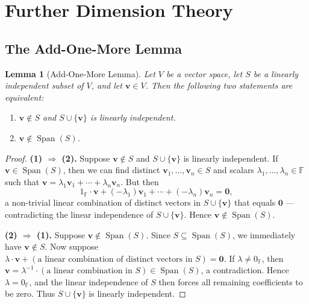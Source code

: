 \documentclass[11pt, a4paper, notitlepage]{report}
\newtheorem{lemma}[theorem]{Lemma}
\theoremstyle{definition}
\theoremstyle{remark}
\begin{document}
\section{Further Dimension Theory}
\label{sec:dimension-week4}

\subsection{The Add-One-More Lemma}

\begin{lemma}[Add-One-More Lemma]\label{lem:add-one-more}
Let $V$ be a vector space, let $S$ be a linearly independent subset of $V$, and let $\mathbf{v}\in V$. Then the following two statements are equivalent:
\begin{enumerate}
  \item $\mathbf{v}\notin S$ and $S\cup\{\mathbf{v}\}$ is linearly independent.
  \item $\mathbf{v}\notin\operatorname{Span}(S)$.
\end{enumerate}
\end{lemma}

\begin{proof}
\textbf{(1) $\Rightarrow$ (2).} Suppose $\mathbf{v}\notin S$ and $S\cup\{\mathbf{v}\}$ is linearly independent. If $\mathbf{v}\in\operatorname{Span}(S)$, then we can find distinct $\mathbf{v}_1, \ldots, \mathbf{v}_n \in S$ and scalars $\lambda_1, \ldots, \lambda_n\in\mathbb{F}$ such that $\mathbf{v} = \lambda_1\mathbf{v}_1 + \cdots + \lambda_n\mathbf{v}_n$. But then
\[
  1_\mathbb{F}\cdot\mathbf{v} + (-\lambda_1)\mathbf{v}_1 + \cdots + (-\lambda_n)\mathbf{v}_n = \mathbf{0},
\]
a non-trivial linear combination of distinct vectors in $S\cup\{\mathbf{v}\}$ that equals $\mathbf{0}$ — contradicting the linear independence of $S\cup\{\mathbf{v}\}$. Hence $\mathbf{v}\notin\operatorname{Span}(S)$.

\textbf{(2) $\Rightarrow$ (1).} Suppose $\mathbf{v}\notin\operatorname{Span}(S)$. Since $S\subseteq\operatorname{Span}(S)$, we immediately have $\mathbf{v}\notin S$. Now suppose $\lambda\cdot\mathbf{v} + (\text{a linear combination of distinct vectors in }S) = \mathbf{0}$. If $\lambda\neq 0_\mathbb{F}$, then $\mathbf{v} = \lambda^{-1}\cdot(\text{a linear combination in }S)\in\operatorname{Span}(S)$, a contradiction. Hence $\lambda = 0_\mathbb{F}$, and the linear independence of $S$ then forces all remaining coefficients to be zero. Thus $S\cup\{\mathbf{v}\}$ is linearly independent.
\end{proof}
\end{document}

